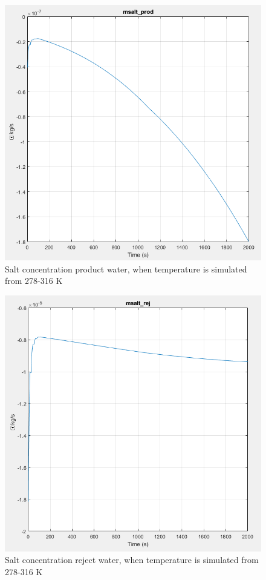 \begin{figure}[h]
\centering
  \includegraphics[width=0.7\linewidth]{msalt_prod.PNG}
  \caption{Salt concentration product water, when temperature is simulated from 278-316 K}
  \label{fig:msaltp}
\end{figure}

\begin{figure}[h]
  \centering
  \includegraphics[width=0.7\linewidth]{msalt_rej.PNG}
  \caption{Salt concentration reject water, when temperature is simulated from 278-316 K}
  \label{fig:msaltr}
\end{figure}
\newpage
\newpage

